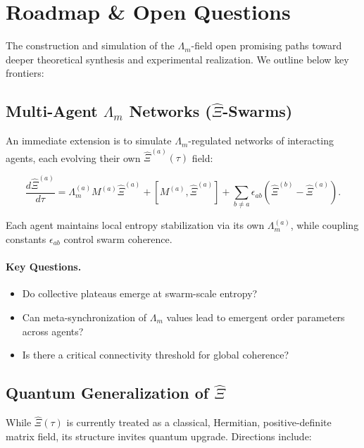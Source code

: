 \documentclass{article}
\theoremstyle{plain}
\theoremstyle{claimstyle}
\begin{document}
\section{Roadmap \& Open Questions}

The construction and simulation of the $\Lambda_m$-field open promising paths toward deeper theoretical synthesis and experimental realization. We outline below key frontiers:

\subsection{Multi-Agent $\Lambda_m$ Networks (\texorpdfstring{$\hat{\Xi}$}{Ξ̂}-Swarms)}

An immediate extension is to simulate $\Lambda_m$-regulated networks of interacting agents, each evolving their own $\hat{\Xi}^{(a)}(\tau)$ field:

\begin{equation}
\frac{d\hat{\Xi}^{(a)}}{d\tau} = \Lambda_m^{(a)} M^{(a)} \hat{\Xi}^{(a)} + [M^{(a)}, \hat{\Xi}^{(a)}] + \sum_{b \neq a} \epsilon_{ab} (\hat{\Xi}^{(b)} - \hat{\Xi}^{(a)}).
\end{equation}

Each agent maintains local entropy stabilization via its own $\Lambda_m^{(a)}$, while coupling constants $\epsilon_{ab}$ control swarm coherence.

\paragraph{Key Questions.}
\begin{itemize}
    \item Do collective plateaus emerge at swarm-scale entropy?
    \item Can meta-synchronization of $\Lambda_m$ values lead to emergent order parameters across agents?
    \item Is there a critical connectivity threshold for global coherence?
\end{itemize}

\subsection{Quantum Generalization of $\hat{\Xi}$}

While $\hat{\Xi}(\tau)$ is currently treated as a classical, Hermitian, positive-definite matrix field, its structure invites quantum upgrade. Directions include:
\end{document}
